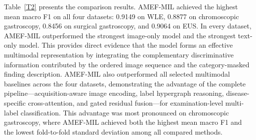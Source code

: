 \documentclass[Afour,sagev,times]{sagej}
\begin{document}
Table~\ref{T2} presents the comparison results. AMEF-MIL achieved the highest mean macro F1 on all four datasets: 0.9149 on WLE, 0.8877 on chromoscopic gastroscopy, 0.8456 on surgical gastroscopy, and 0.9064 on EUS. In every dataset, AMEF-MIL outperformed the strongest image-only model and the strongest text-only model. This provides direct evidence that the model forms an effective multimodal representation by integrating the complementary discriminative information contributed by the ordered image sequence and the category-masked finding description. AMEF-MIL also outperformed all selected multimodal baselines across the four datasets, demonstrating the advantage of the complete pipeline---acquisition-aware image encoding, label hypergraph reasoning, disease-specific cross-attention, and gated residual fusion---for examination-level multi-label classification. This advantage was most pronounced on chromoscopic gastroscopy, where AMEF-MIL achieved both the highest mean macro F1 and the lowest fold-to-fold standard deviation among all compared methods.
\end{document}
